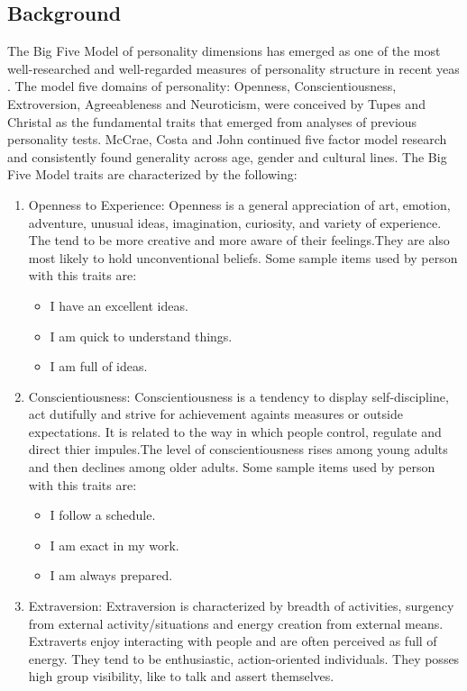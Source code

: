 \subsection{Background}
The Big Five Model of personality dimensions has emerged as one of the most well-researched and well-regarded measures of personality structure in recent yeas \cite{fivefactormodel}. The model five domains of personality: Openness, Conscientiousness, Extroversion, Agreeableness and Neuroticism, were conceived by Tupes and Christal \cite{tupes} as the fundamental traits that emerged from analyses of previous personality tests. McCrae, Costa and John \cite{mccrae} continued five factor model research and consistently found generality across age, gender and cultural lines.
The Big Five Model traits are characterized by the following:
\begin{enumerate}
	\item Openness to Experience: Openness is a general appreciation of art, emotion, adventure, unusual ideas, imagination, curiosity, and variety of experience. The tend to be more creative and more aware of their feelings.They are also most likely to hold unconventional beliefs.
Some sample items used by person with this traits are:
\begin{itemize}
	\item I have an excellent ideas.
	\item I am quick to understand things.
	\item I am full of ideas.
\end{itemize}
\item Conscientiousness: Conscientiousness is a tendency to display self-discipline, act dutifully and strive for achievement againts measures or outside expectations. It is related to the way in which people control, regulate and direct thier impules.The level of conscientiousness rises among young adults and then declines among older adults.
Some sample items used by person with this traits are:
\begin{itemize}
	\item I follow a schedule.
	\item I am exact in my work.
	\item I am always prepared.
\end{itemize}
\item Extraversion: Extraversion is characterized by breadth of activities, surgency from external activity/situations and energy creation from external means. Extraverts enjoy interacting with people and are often perceived as full of energy. They tend to be enthusiastic, action-oriented individuals. They posses high group visibility, like to talk and assert themselves.

\end{enumerate}
